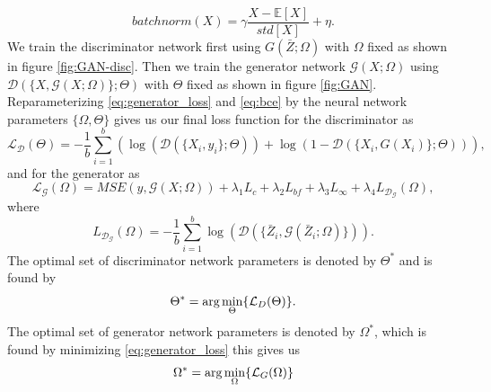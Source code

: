 \documentclass{article}
\theoremstyle{plain}%
\theoremstyle{definition}
\theoremstyle{remark}
\begin{document}
\[
    batchnorm(X) = \gamma\frac{X-\mathbb{E}[X]}{std[X]} + \eta.
\]
We train the discriminator network first using $G(\bar{Z};\Omega)$ with $\Omega$ fixed as shown in figure \ref{fig:GAN-disc}. Then we train the generator network $\mathcal{G}(X;\Omega)$ using $\mathcal{D}(\{X,\mathcal{G}(X;\Omega)\};\Theta)$ with $\Theta$ fixed as shown in figure \ref{fig:GAN}. Reparameterizing \eqref{eq:generator_loss} and \eqref{eq:bce} by the neural network parameters $\{\Omega, \Theta\}$ gives us our final  loss function for the discriminator as
\begin{equation}
	\mathcal{L}_\mathcal{D}(\Theta) = -\frac{1}{b} \sum_{i = 1}^b \left(\log(\mathcal{D}(\{X_i,y_i\};\Theta))  + \log (1-\mathcal{D}(\{X_i,G(X_i)\};\Theta))\right),
 \label{eq:d_net_loss}
\end{equation}
 and for the generator as
 \begin{equation}
	\mathcal{L}_{\mathcal{G}}(\Omega) = MSE(y, \mathcal{G}(X;\Omega)) + \lambda_1 L_c + \lambda_2 L_{bf} + \lambda_3 L_\infty + \lambda_4 L_{\mathcal{D}_\mathcal{G}}(\Omega),
 \label{eq:g_net_loss}
\end{equation}
where 
\[
	L_{\mathcal{D}_\mathcal{G}}(\Omega) = -\frac{1}{b} \sum_{i = 1}^b \log(\mathcal{D}(\{\bar{Z}_i,\mathcal{G}(\bar{Z}_i;\Omega)\})).
 \]
The optimal set of discriminator network parameters is denoted by $\Theta^*$ and is found by
\begin{equation*}
    \Theta^* = \textnormal{arg}\min_{\Theta}\{\mathcal{L}_D(\Theta)\}.
\end{equation*}
The optimal set of generator network parameters is denoted by $\Omega^*$, which is found by minimizing \eqref{eq:generator_loss} this gives us
\[
    \Omega^* = \textnormal{arg}\min_{\Omega}\{\mathcal{L}_G(\Omega)\}
\]
\end{document}
